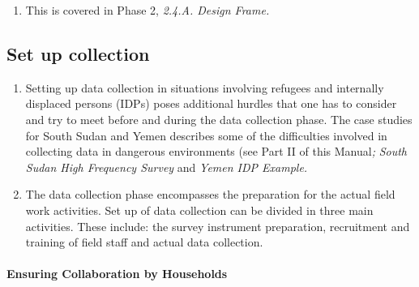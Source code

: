 \documentclass[
]{article}
\providecommand{\tightlist}{%
  \setlength{\itemsep}{0pt}\setlength{\parskip}{0pt}}
\begin{document}
\begin{enumerate}
\def\labelenumi{\arabic{enumi}.}
\setcounter{enumi}{319}
\tightlist
\item
  This is covered in Phase 2, \emph{2.4.A. Design Frame.}
\end{enumerate}

\hypertarget{set-up-collection-1}{%
\subsection{Set up collection}\label{set-up-collection-1}}

\begin{enumerate}
\def\labelenumi{\arabic{enumi}.}
\setcounter{enumi}{320}
\item
  Setting up data collection in situations involving refugees and
  internally displaced persons (IDPs) poses additional hurdles that
  one has to consider and try to meet before and during the data
  collection phase. The case studies for South Sudan and Yemen
  describes some of the difficulties involved in collecting data in
  dangerous environments (see Part II of this Manual\emph{;} \emph{South Sudan
  High Frequency Survey} and \emph{Yemen IDP Example.}
\item
  The data collection phase encompasses the preparation for the
  actual field work activities. Set up of data collection can be
  divided in three main activities. These include: the survey
  instrument preparation, recruitment and training of field staff and
  actual data collection.
\end{enumerate}

\hypertarget{ensuring-collaboration-by-households-1}{%
\paragraph{Ensuring Collaboration by Households}\label{ensuring-collaboration-by-households-1}}
\end{document}
